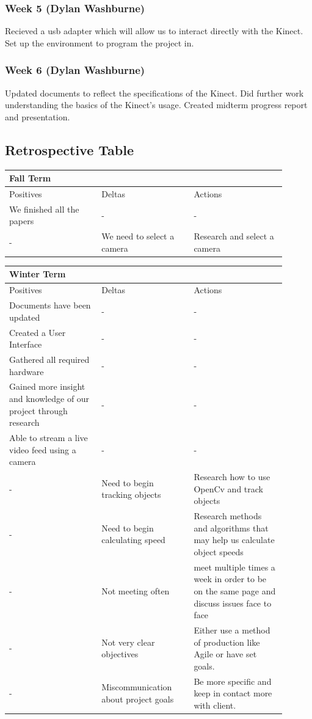 \documentclass[onecolumn, draftclsnofoot,10pt, compsoc]{IEEEtran}
\begin{document}
\subsubsection{Week 5 (Dylan Washburne) }
Recieved a usb adapter which will allow us to interact directly with the Kinect.  Set up the environment to program the project in.

\subsubsection{Week 6 (Dylan Washburne)}
Updated documents to reflect the specifications of the Kinect.  Did further work understanding the basics of the Kinect's usage.  Created midterm progress report and presentation.

\subsection{Retrospective Table}

\begin{tabular}{|p{0.3\linewidth} |p{0.3\linewidth}|p{0.3\linewidth}|}
\hline 
 Fall Term & & \\
\hline 
Positives & Deltas & Actions \\
\hline
We finished all the papers & - & - \\
\hline
- & We need to select a camera & Research and select a camera \\
\hline


\end{tabular}

\begin{tabular}{|p{0.3\linewidth} |p{0.3\linewidth}|p{0.3\linewidth}|}
\hline 
Winter Term & & \\
\hline 
Positives & Deltas & Actions \\
\hline
Documents have been updated & - & - \\
\hline
Created a User Interface & - & - \\
\hline
Gathered all required hardware & - & - \\
\hline
Gained more insight and knowledge of our project through research & - & - \\
\hline
Able to stream a live video feed using a camera & - & - \\
\hline
- & Need to begin tracking objects & Research how to use OpenCv and track objects \\
\hline
- & Need to begin calculating speed & Research methods and algorithms that may help us calculate object speeds \\
\hline
- & Not meeting often & meet multiple times a week in order to be on the same page and discuss issues face to face \\
\hline
- & Not very clear objectives & Either use a method of production like Agile or have set goals. \\
\hline
- & Miscommunication about project goals & Be more specific and keep in contact more with client. \\
\hline
\end{tabular}
\end{document}
